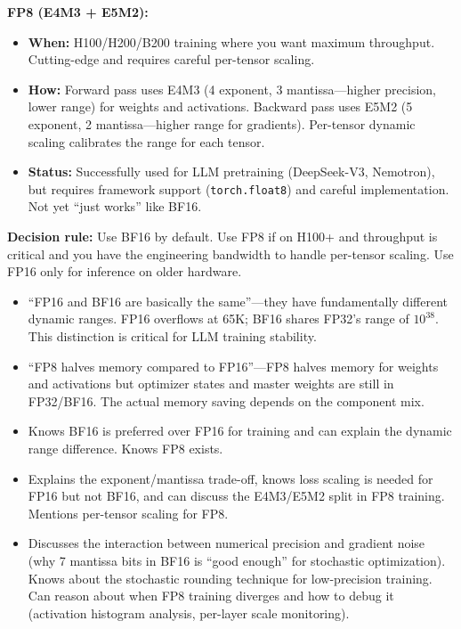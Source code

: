 \begin{interviewq}
\textbf{FP8 (E4M3 + E5M2):}
\begin{itemize}
    \item \textbf{When:} H100/H200/B200 training where you want maximum throughput. Cutting-edge and requires careful per-tensor scaling.
    \item \textbf{How:} Forward pass uses E4M3 (4 exponent, 3 mantissa---higher precision, lower range) for weights and activations. Backward pass uses E5M2 (5 exponent, 2 mantissa---higher range for gradients). Per-tensor dynamic scaling calibrates the range for each tensor.
    \item \textbf{Status:} Successfully used for LLM pretraining (DeepSeek-V3, Nemotron), but requires framework support (\texttt{torch.float8}) and careful implementation. Not yet ``just works'' like BF16.
\end{itemize}

\textbf{Decision rule:} Use BF16 by default. Use FP8 if on H100+ and throughput is critical and you have the engineering bandwidth to handle per-tensor scaling. Use FP16 only for inference on older hardware.

\redflags
\begin{itemize}
    \item ``FP16 and BF16 are basically the same''---they have fundamentally different dynamic ranges. FP16 overflows at 65K; BF16 shares FP32's range of $10^{38}$. This distinction is critical for LLM training stability.
    \item ``FP8 halves memory compared to FP16''---FP8 halves memory for weights and activations but optimizer states and master weights are still in FP32/BF16. The actual memory saving depends on the component mix.
\end{itemize}


\goodgreat
\begin{itemize}
    \item {} Knows BF16 is preferred over FP16 for training and can explain the dynamic range difference. Knows FP8 exists.
    \item {} Explains the exponent/mantissa trade-off, knows loss scaling is needed for FP16 but not BF16, and can discuss the E4M3/E5M2 split in FP8 training. Mentions per-tensor scaling for FP8.
    \item {} Discusses the interaction between numerical precision and gradient noise (why 7 mantissa bits in BF16 is ``good enough'' for stochastic optimization). Knows about the stochastic rounding technique for low-precision training. Can reason about when FP8 training diverges and how to debug it (activation histogram analysis, per-layer scale monitoring).
\end{itemize}

\end{interviewq}